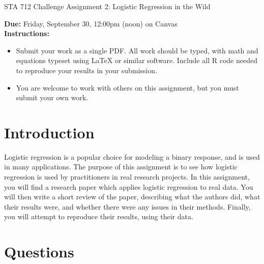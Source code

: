 \documentclass[11pt]{article}
\begin{document}
\begin{center}
\Large
STA 712 Challenge Assignment 2: Logistic Regression in the Wild\\
\normalsize
\vspace{5mm}
\end{center}

\noindent \textbf{Due:} Friday, September 30, 12:00pm (noon) on Canvas\\ 

\noindent \textbf{Instructions:} 
\begin{itemize}
\item Submit your work as a single PDF. All work should be typed, with math and equations typeset using LaTeX or similar software. Include all R code needed to reproduce your results in your submission.
\item You are welcome to work with others on this assignment, but you must submit your own work.
\end{itemize}

\section*{Introduction}

Logistic regression is a popular choice for modeling a binary response, and is used in many applications. The purpose of this assignment is to see how logistic regression is used by practitioners in real research projects. In this assignment, you will find a research paper which applies logistic regression to real data. You will then write a short review of the paper, describing what the authors did, what their results were, and whether there were any issues in their methods. Finally, you will attempt to reproduce their results, using their data.

\section*{Questions}
\end{document}
